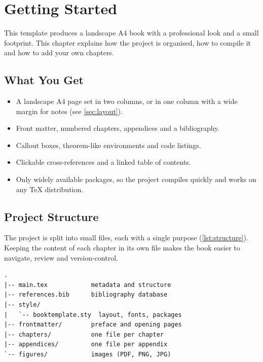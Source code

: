 \chapter{Getting Started}\label{chap:getting-started}

This template produces a landscape A4 book with a professional look and a
small footprint. This chapter explains how the project is organised, how to
compile it and how to add your own chapters.

\section{What You Get}

\begin{itemize}
  \item A landscape A4 page set in two columns, or in one column with a wide
        margin for notes (see \cref{sec:layout}).
  \item Front matter, numbered chapters, appendices and a bibliography.
  \item Callout boxes, theorem-like environments and code listings.
  \item Clickable cross-references and a linked table of contents.
  \item Only widely available packages, so the project compiles quickly and
        works on any \TeX{} distribution.
\end{itemize}

\section{Project Structure}\label{sec:structure}

The project is split into small files, each with a single purpose
(\cref{lst:structure}). Keeping the content of each chapter in its own file
makes the book easier to navigate, review and version-control.

\begin{lstlisting}[language={}, caption={Layout of the project.}, label={lst:structure}, float=tb]
.
|-- main.tex            metadata and structure
|-- references.bib      bibliography database
|-- style/
|   `-- booktemplate.sty  layout, fonts, packages
|-- frontmatter/        preface and opening pages
|-- chapters/           one file per chapter
|-- appendices/         one file per appendix
`-- figures/            images (PDF, PNG, JPG)
\end{lstlisting}

